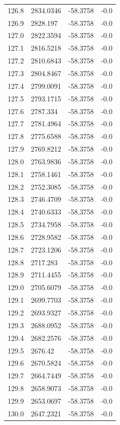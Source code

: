 \begin{table}[H]
\begin{tabular}{llll}
126.8 & 2834.0346 & -58.3758 & -0.0 \\
126.9 & 2828.197 & -58.3758 & -0.0 \\
127.0 & 2822.3594 & -58.3758 & -0.0 \\
127.1 & 2816.5218 & -58.3758 & -0.0 \\
127.2 & 2810.6843 & -58.3758 & -0.0 \\
127.3 & 2804.8467 & -58.3758 & -0.0 \\
127.4 & 2799.0091 & -58.3758 & -0.0 \\
127.5 & 2793.1715 & -58.3758 & -0.0 \\
127.6 & 2787.334 & -58.3758 & -0.0 \\
127.7 & 2781.4964 & -58.3758 & -0.0 \\
127.8 & 2775.6588 & -58.3758 & -0.0 \\
127.9 & 2769.8212 & -58.3758 & -0.0 \\
128.0 & 2763.9836 & -58.3758 & -0.0 \\
128.1 & 2758.1461 & -58.3758 & -0.0 \\
128.2 & 2752.3085 & -58.3758 & -0.0 \\
128.3 & 2746.4709 & -58.3758 & -0.0 \\
128.4 & 2740.6333 & -58.3758 & -0.0 \\
128.5 & 2734.7958 & -58.3758 & -0.0 \\
128.6 & 2728.9582 & -58.3758 & -0.0 \\
128.7 & 2723.1206 & -58.3758 & -0.0 \\
128.8 & 2717.283 & -58.3758 & -0.0 \\
128.9 & 2711.4455 & -58.3758 & -0.0 \\
129.0 & 2705.6079 & -58.3758 & -0.0 \\
129.1 & 2699.7703 & -58.3758 & -0.0 \\
129.2 & 2693.9327 & -58.3758 & -0.0 \\
129.3 & 2688.0952 & -58.3758 & -0.0 \\
129.4 & 2682.2576 & -58.3758 & -0.0 \\
129.5 & 2676.42 & -58.3758 & -0.0 \\
129.6 & 2670.5824 & -58.3758 & -0.0 \\
129.7 & 2664.7449 & -58.3758 & -0.0 \\
129.8 & 2658.9073 & -58.3758 & -0.0 \\
129.9 & 2653.0697 & -58.3758 & -0.0 \\
130.0 & 2647.2321 & -58.3758 & -0.0 \\

\end{tabular}
\end{table}
